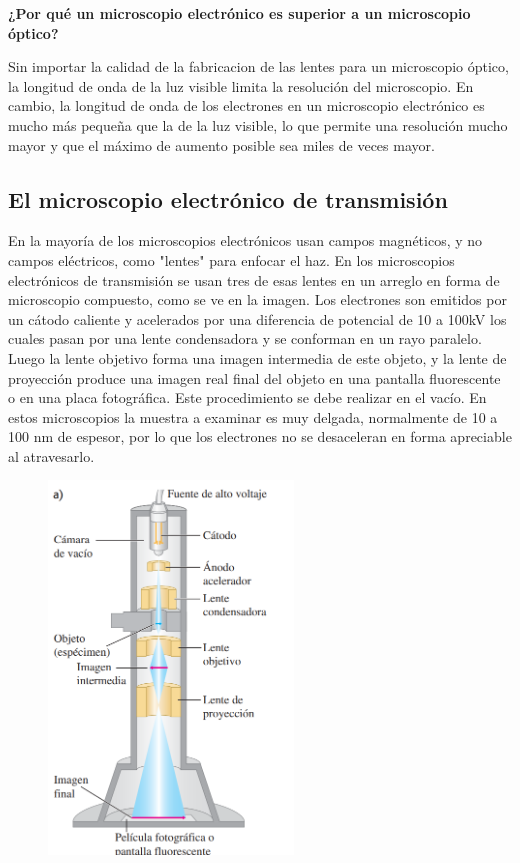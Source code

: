 \documentclass[a4paper]{article}
\begin{document}
    \indent \textbf{¿Por qué un microscopio electrónico es superior a un microscopio óptico?}\\

    \newpage
    \noindent
    \thispagestyle{fancy}

    \indent Sin importar la calidad de la fabricacion de las lentes para un microscopio óptico, la longitud de onda de la luz visible limita la resolución del microscopio. En cambio, la longitud de onda de los electrones en un microscopio electrónico es mucho más pequeña que la de la luz visible, lo que permite una resolución mucho mayor y que el máximo de aumento posible sea miles de veces mayor.\\

    \subsection{El microscopio electrónico de transmisión}

    \indent En la mayoría de los microscopios electrónicos usan campos magnéticos, y no campos eléctricos, como "lentes" para enfocar el haz. En los microscopios electrónicos de transmisión se usan tres de esas lentes en un arreglo en forma de microscopio compuesto, como se ve en la imagen. Los electrones son emitidos por un cátodo caliente y acelerados por una diferencia de potencial de 10 a 100kV los cuales pasan por una lente condensadora y se conforman en un rayo paralelo. Luego la lente objetivo forma una imagen intermedia de este objeto, y la lente de proyección produce una imagen real final del objeto en una pantalla fluorescente o en una placa fotográfica. Este procedimiento se debe realizar en el vacío. En estos microscopios la muestra a examinar es muy delgada, normalmente de 10 a 100 nm de espesor, por lo que los electrones no se desaceleran en forma apreciable al atravesarlo.\\

    \begin{figure}[h!]
        \centering
        \includegraphics[width = 6.5cm]{../microscopio.png}
    \end{figure}
\end{document}
